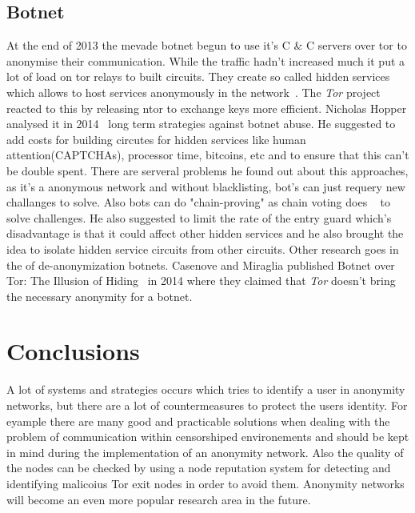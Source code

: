 \documentclass{sig-alternate}
\begin{document}
\subsection{Botnet}
At the end of 2013 the mevade botnet begun to use it's C \& C servers over tor to anonymise their communication. While the traffic hadn't increased much it put a lot of load on tor relays to built circuits. They create so called hidden services~\cite{linkTen} which allows to host services anonymously in the network~\cite{linkEleven}. The \textit{Tor} project reacted to this by releasing ntor to exchange keys more efficient. Nicholas Hopper analysed it in 2014~\cite{hopperchallenges} long term strategies against botnet abuse. He suggested to add costs for building circutes for hidden services like human attention(CAPTCHAs), processor time, bitcoins, etc and to ensure that this can't be double spent. There are serveral problems he found out about this approaches, as it's a anonymous network and without blacklisting, bot's can just requery new challanges to solve. Also bots can do "chain-proving" as chain voting does ~\cite{jones2005chain} to solve challenges.  He also suggested to limit the rate of the entry guard which's disadvantage is that it could affect other hidden services and he also brought the idea to isolate hidden service circuits from other circuits.
Other research goes in the of de-anonymization botnets. Casenove and Miraglia published Botnet over Tor: The Illusion of Hiding~\cite{casenove2014botnet} in 2014 where they claimed that \textit{Tor} doesn't bring the necessary anonymity for a botnet.

\section{Conclusions}
A lot of systems and strategies occurs which tries to identify a user in anonymity networks, but there are a lot of countermeasures to protect the users identity.
For eyample there are many good and practicable solutions when dealing with the problem of communication within censorshiped environements and should be kept in mind during the implementation of an anonymity network. Also the quality of the nodes can be checked by using a node reputation system for detecting and identifying malicoius Tor exit nodes in order to avoid them. 
Anonymity networks will become an even more popular research area in the future.


\end{document}
